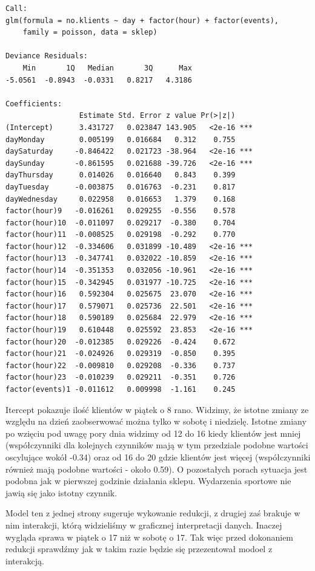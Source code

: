 \documentclass[a4paper,11pt]{article}
\begin{document}
\begin{verbatim}
Call:
glm(formula = no.klients ~ day + factor(hour) + factor(events), 
    family = poisson, data = sklep)

Deviance Residuals: 
    Min       1Q   Median       3Q      Max  
-5.0561  -0.8943  -0.0331   0.8217   4.3186  

Coefficients:
                 Estimate Std. Error z value Pr(>|z|)    
(Intercept)      3.431727   0.023847 143.905   <2e-16 ***
dayMonday        0.005199   0.016684   0.312    0.755    
daySaturday     -0.846422   0.021723 -38.964   <2e-16 ***
daySunday       -0.861595   0.021688 -39.726   <2e-16 ***
dayThursday      0.014026   0.016640   0.843    0.399    
dayTuesday      -0.003875   0.016763  -0.231    0.817    
dayWednesday     0.022958   0.016653   1.379    0.168    
factor(hour)9   -0.016261   0.029255  -0.556    0.578    
factor(hour)10  -0.011097   0.029217  -0.380    0.704    
factor(hour)11  -0.008525   0.029198  -0.292    0.770    
factor(hour)12  -0.334606   0.031899 -10.489   <2e-16 ***
factor(hour)13  -0.347741   0.032022 -10.859   <2e-16 ***
factor(hour)14  -0.351353   0.032056 -10.961   <2e-16 ***
factor(hour)15  -0.342945   0.031977 -10.725   <2e-16 ***
factor(hour)16   0.592304   0.025675  23.070   <2e-16 ***
factor(hour)17   0.579071   0.025736  22.501   <2e-16 ***
factor(hour)18   0.590189   0.025684  22.979   <2e-16 ***
factor(hour)19   0.610448   0.025592  23.853   <2e-16 ***
factor(hour)20  -0.012385   0.029226  -0.424    0.672    
factor(hour)21  -0.024926   0.029319  -0.850    0.395    
factor(hour)22  -0.009810   0.029208  -0.336    0.737    
factor(hour)23  -0.010239   0.029211  -0.351    0.726    
factor(events)1 -0.011612   0.009998  -1.161    0.245    
\end{verbatim}

Itercept pokazuje ilość klientów w piątek o 8 rano. Widzimy, że istotne zmiany ze względu na dzień zaobserwować można tylko w sobotę i niedzielę. Istotne zmiany po wzięciu pod uwagę pory dnia widzimy od 12 do 16 kiedy klientów jest mniej (współczynniki dla kolejnych czynników mają w tym przedziale podobne wartości oscylujące wokół -0.34) oraz od 16 do 20 gdzie klientów jest więcej (współczynniki również mają podobne wartości - około 0.59). O pozostałych porach sytuacja jest podobna jak w pierwszej godzinie działania sklepu. Wydarzenia sportowe nie jawią się jako istotny czynnik. 

Model  ten z jednej strony sugeruje wykowanie redukcji, z drugiej zaś  brakuje w nim interakcji, którą widzieliśmy w graficznej interpretacji danych. Inaczej wygląda sprawa w piątek o 17 niż w sobotę  o 17. Tak więc przed dokonaniem redukcji sprawdźmy jak w takim razie będzie się przezentował modoel z interakcją. 
\end{document}
